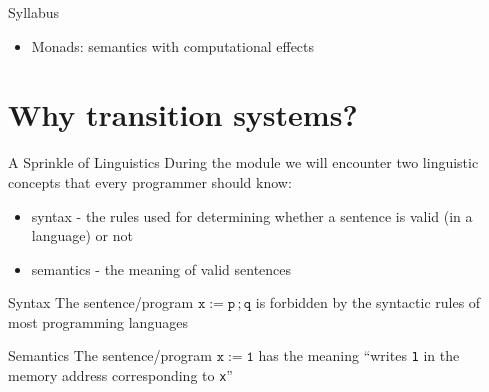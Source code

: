 \documentclass[aspectratio=169]{beamer}
\begin{document}
\begin{slide}{Syllabus}
{\begin{itemize}
\begin{itemize}
        \item Semantics
        \item {Lince tool}
        \begin{itemize}
          \item Specification
          \item Analysis
        \end{itemize}
      \end{itemize}
      \item {Monads}: semantics with computational effects
    \end{itemize}
  }
\end{slide}
\section{Why transition systems?}

\begin{frame}{A Sprinkle of Linguistics}
  During the module we will encounter two linguistic concepts that every programmer
  should know:
  \begin{itemize}
  \item \alert{syntax} - the rules used for determining whether a sentence
    is valid (in a language) or not
  \item \alert{semantics} - the meaning of valid sentences
  \end{itemize}

  \vfill
  \begin{exampleblock}{\exercise Syntax}
      The sentence/program $\mathtt{x := p\, ;q}$ is forbidden by
      the syntactic rules of most programming languages
    \end{exampleblock}
  \begin{exampleblock}{\exercise Semantics}
      The sentence/program $\mathtt{x := 1}$ has the meaning
      ``writes \texttt{1} in the memory address corresponding to \texttt{x}''
  \end{exampleblock}
\end{frame}
\end{document}
